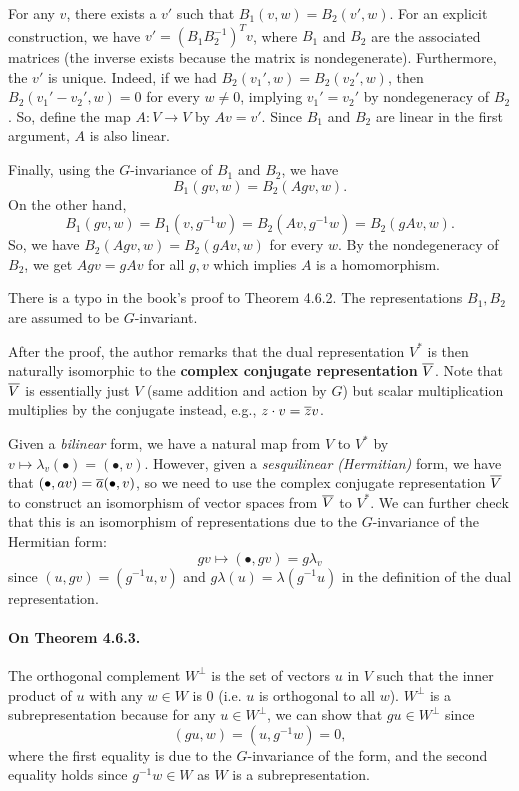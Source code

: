 \documentclass[oneside]{scrbook}
\begin{document}
For any $v$, there exists a $v'$ such that $B_1(v,w)=B_2(v',w)$. For an explicit construction, we have $v'=(B_1B_2^{-1})^Tv$, where $B_1$ and $B_2$ are the associated matrices (the inverse exists because the matrix is nondegenerate). Furthermore, the $v'$ is unique. Indeed, if we had $B_2(v_1',w)=B_2(v_2',w)$, then $B_2(v_1'-v_2',w)=0$ for every $w\neq 0$, implying $v_1'=v_2'$ by nondegeneracy of $B_2$. So, define the map $A\colon V\to V$ by $Av=v'$. Since $B_1$ and $B_2$ are linear in the first argument, $A$ is also linear. 

Finally, using the $G$-invariance of $B_1$ and $B_2$, we have
\[B_1(gv,w)=B_2(Agv,w).\]
On the other hand,
\[B_1(gv,w)=B_1(v,g^{-1}w)=B_2(Av,g^{-1}w)=B_2(gAv,w).\]
So, we have $B_2(Agv,w)=B_2(gAv,w)$ for every $w$. By the nondegeneracy of $B_2$, we get $Agv=gAv$ for all $g,v$ which implies $A$ is a homomorphism. 

\begin{remark}
There is a typo in the book's proof to Theorem 4.6.2. The representations $B_1,B_2$ are assumed to be $G$-invariant.
\end{remark}

After the proof, the author remarks that the dual representation $V^*$ is then naturally isomorphic to the \textbf{complex conjugate representation} $\overline{V}$. Note that $\overline{V}$ is essentially just $V$ (same addition and action by $G$) but scalar multiplication multiplies by the conjugate instead, e.g., $z\cdot v=\overline{z}v$. 

Given a \textit{bilinear} form, we have a natural map from $V$ to $V^*$ by $v\mapsto \lambda_v(\bullet)=(\bullet, v)$. However, given a \textit{sesquilinear (Hermitian)} form, we have that $(\bullet, av)=\overline{a}(\bullet, v)$, so we need to use the complex conjugate representation $\overline{V}$ to construct an isomorphism of vector spaces from $\overline{V}$ to $V^*$. We can further check that this is an isomorphism of representations due to the $G$-invariance of the Hermitian form:
\[gv\mapsto (\bullet, gv)=g\lambda_v\]
since $(u,gv)=(g^{-1}u,v)$ and $g\lambda(u)=\lambda(g^{-1}u)$ in the definition of the dual representation.

\paragraph{On Theorem 4.6.3.} The orthogonal complement $W^\perp$ is the set of vectors $u$ in $V$ such that the inner product of $u$ with any $w\in W$ is 0 (i.e. $u$ is orthogonal to all $w$). $W^\perp$ is a subrepresentation because for any $u\in W^\perp$, we can show that $gu\in W^{\perp}$ since
\[(gu,w)=(u,g^{-1}w)=0,\]
where the first equality is due to the $G$-invariance of the form, and the second equality holds since $g^{-1}w\in W$ as $W$ is a subrepresentation.
\end{document}
